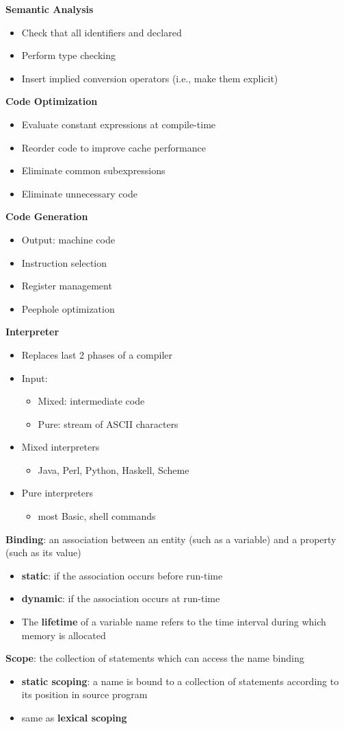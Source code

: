 \documentclass[11pt]{article} %
\begin{document}
{\bf Semantic Analysis}
\begin{itemize}
\item Check that all identifiers and declared
\item Perform type checking
\item Insert implied conversion operators (i.e., make them explicit)
\end{itemize}

{\bf Code Optimization}
\begin{itemize}
\item Evaluate constant expressions at compile-time
\item Reorder code to improve cache performance
\item Eliminate common subexpressions
\item Eliminate unnecessary code
\end{itemize}

{\bf Code Generation}
\begin{itemize}
\item Output: machine code
\item Instruction selection
\item Register management
\item Peephole optimization
\end{itemize}

\pagebreak

{\bf Interpreter}
\begin{itemize}
\item Replaces last 2 phases of a compiler
\item Input:
\begin{itemize}
\item Mixed: intermediate code
\item Pure: stream of ASCII characters
\end{itemize}
\item Mixed interpreters
\begin{itemize}
\item Java, Perl, Python, Haskell, Scheme
\end{itemize}
\item Pure interpreters
\begin{itemize}
\item most Basic, shell commands
\end{itemize}
\end{itemize}

{\bf Binding}: an association between an entity (such as a variable) and a property (such as its value)
\begin{itemize}
\item {\bf static}: if the association occurs before run-time
\item {\bf dynamic}: if the association occurs at run-time
\item The {\bf lifetime} of a variable name refers to the time interval during which memory is allocated
\end{itemize}

{\bf Scope}: the collection of statements which can access the name binding
\begin{itemize}
\item {\bf static scoping}: a name is bound to a collection of statements according to its position in source program
\item same as {\bf lexical scoping}
\end{itemize}
\end{document}
